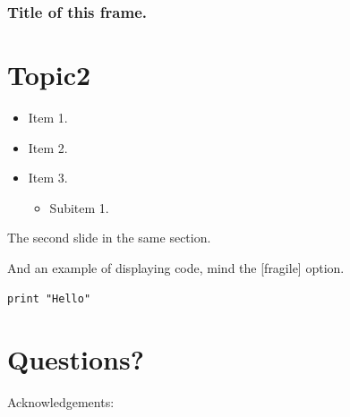 \documentclass[slidestop]{beamer}
\begin{document}
\begin{fframe}
  \frametitle{Title of this frame.}

  \vfill
\end{fframe}

\section{Topic2}
\begin{frame}
  \begin{itemize}
    \item Item 1.
    \item Item 2.
    \pause
    \item Item 3.
    \pause
    \begin{itemize}
      \item Subitem 1.
    \end{itemize}
  \end{itemize}
\end{frame}

\begin{frame}
  The second slide in the same section.
\end{frame}

\begin{frame}[fragile]
  And an example of displaying code, mind the [fragile] option.

  \begin{lstlisting}[caption = {Example input}]
    print "Hello"
  \end{lstlisting}
\end{frame}

\section{Questions?}
\lastpagetemplate
\begin{frame}
  \begin{center}
    Acknowledgements:
    \bigskip
    \bigskip

  \end{center}
\end{frame}
\end{document}
